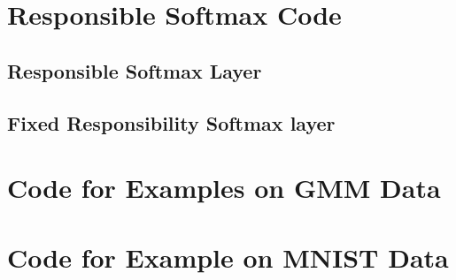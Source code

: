 

\newpage


\chapter{Responsible Softmax Code}\label{app:RScode}
\section{Responsible Softmax Layer}\label{code:RSlayer}







\section{Fixed Responsibility Softmax layer}\label{code:fixedRSLayer}



\chapter{Code for Examples on GMM Data}\label{app:GMMexample}






\chapter{Code for Example on MNIST Data}\label{app:MNISTexample}




\begin{verbatim}


\end{verbatim}
